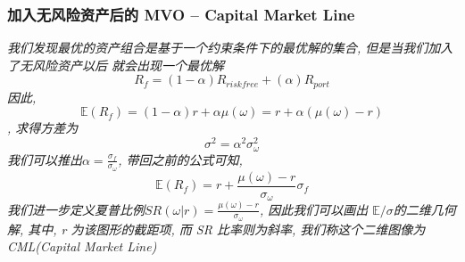 \documentclass{scrartcl}
\numberwithin{equation}{section}   %
\begin{document}
\newpage
\subsubsection{加入无风险资产后的 MVO --  Capital Market Line }
\textsl{我们发现最优的资产组合是基于一个约束条件下的最优解的集合, 但是当我们加入了无风险资产以后 就会出现一个最优解 $$R_f = (1- \alpha) R_{riskfree} + (\alpha) R_{port}$$因此, $$ \mathbb{E}(R_f)= (1-\alpha) r + \alpha\mu(\omega )  = r + \alpha(\mu(\omega) -r)$$, 求得方差为 $$\sigma^2 = \alpha^2 \sigma_{\omega}^2$$ 我们可以推出$\alpha = \frac{\sigma_f}{\sigma_{\omega}}$, 带回之前的公式可知, $$\mathbb{E}(R_f) =  r+\frac{\mu(\omega) -r}{\sigma_{\omega}} \sigma_f $$ 我们进一步定义夏普比例$SR(\omega| r)  =\frac{\mu(\omega) -r}{\sigma_{\omega}} $, 因此我们可以画出 $\mathbb{E} / \sigma$的二维几何解, 其中, r 为该图形的截距项, 而 SR 比率则为斜率, 我们称这个二维图像为  CML(Capital Market Line)}
\end{document}
